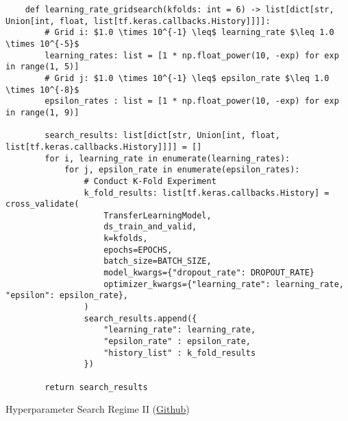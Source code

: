 \begin{listing}[H]
    \begin{verbatim}
    def learning_rate_gridsearch(kfolds: int = 6) -> list[dict[str, Union[int, float, list[tf.keras.callbacks.History]]]]:
        # Grid i: $1.0 \times 10^{-1} \leq$ learning_rate $\leq 1.0 \times 10^{-5}$
        learning_rates: list = [1 * np.float_power(10, -exp) for exp in range(1, 5)]
        # Grid j: $1.0 \times 10^{-1} \leq$ epsilon_rate $\leq 1.0 \times 10^{-8}$
        epsilon_rates : list = [1 * np.float_power(10, -exp) for exp in range(1, 9)]

        search_results: list[dict[str, Union[int, float, list[tf.keras.callbacks.History]]]] = []
        for i, learning_rate in enumerate(learning_rates):
            for j, epsilon_rate in enumerate(epsilon_rates):
                # Conduct K-Fold Experiment
                k_fold_results: list[tf.keras.callbacks.History] = cross_validate(
                    TransferLearningModel,
                    ds_train_and_valid,
                    k=kfolds,
                    epochs=EPOCHS,
                    batch_size=BATCH_SIZE,
                    model_kwargs={"dropout_rate": DROPOUT_RATE}
                    optimizer_kwargs={"learning_rate": learning_rate, "epsilon": epsilon_rate},
                )
                search_results.append({
                    "learning_rate": learning_rate,
                    "epsilon_rate" : epsilon_rate,
                    "history_list" : k_fold_results
                })

        return search_results
    \end{verbatim}
\caption{Hyperparameter Search Regime II (\href{https://github.com/ShenZhouHong/radiography-ai-project/blob/master/python/hyperparam-search/regime-2.ipynb}{Github})}\label{listing:regime-2}
\end{listing}